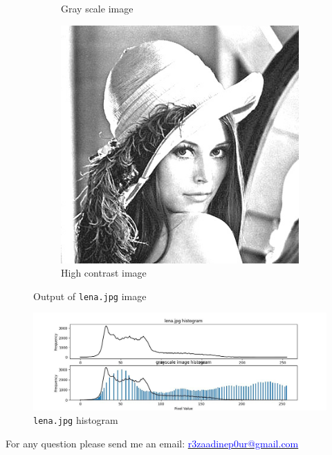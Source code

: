 \documentclass[12pt]{article}
\begin{document}
\begin{figure}
\begin{subfigure}[b]{0.3\textwidth}
		\caption{Gray scale image}
		\label{fig:gray_lena}
	\end{subfigure}
	\hfill
	\begin{subfigure}[b]{0.3\textwidth}
		\centering
		\includegraphics[width=\textwidth]{images/high_contrast_lena}
		\caption{High contrast image}
		\label{fig:lena_high}
	\end{subfigure}
	\caption{Output of \texttt{lena.jpg} image}
	\label{fig:lena}
\end{figure}

\begin{figure}[h]
	\centering
	\includegraphics[width=1\textwidth]{images/fig_lena}
	\caption{\texttt{lena.jpg} histogram}
	\label{fig:lena_hist}
\end{figure}

For any question please send me an email:
\href{mailto:r3zaadinep0ur@gmail.com}{\textcolor{blue}{r3zaadinep0ur@gmail.com}}
\end{document}
